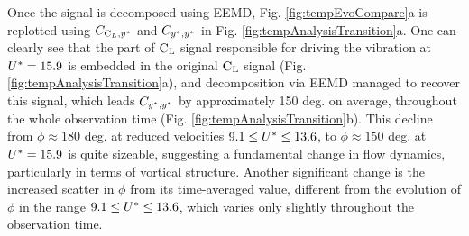 \documentclass[oneside]{utmthesis}
\begin{document}
Once the signal is decomposed using EEMD, Fig. \ref{fig:tempEvoCompare}a is replotted using $C_{\text{C}_{L},y^{*}}$ and $C_{y^{*},y^{*}}$ in Fig. \ref{fig:tempAnalysisTransition}a. One can clearly see that the part of $\text{C}_{\text{L}}$ signal responsible for driving the vibration at  $U^{*} = 15.9$ is embedded in the original $\text{C}_{\text{L}}$ signal (Fig. \ref{fig:tempAnalysisTransition}a), and decomposition via EEMD managed to recover this signal, which leads $C_{y^{*},y^{*}}$ by approximately 150 deg. on average, throughout the whole observation time (Fig. \ref{fig:tempAnalysisTransition}b). This decline from $\phi \approx 180$ deg. at reduced velocities $9.1 \leq U^{*} \leq 13.6$, to $\phi \approx 150$ deg. at $U^{*} = 15.9$ is quite sizeable, suggesting a fundamental change in flow dynamics, particularly in terms of vortical structure. Another significant change is the increased scatter in $\phi$ from its time-averaged value, different from the evolution of $\phi$ in the range $9.1 \leq U^{*} \leq 13.6$, which varies only slightly throughout the observation time.
\end{document}
